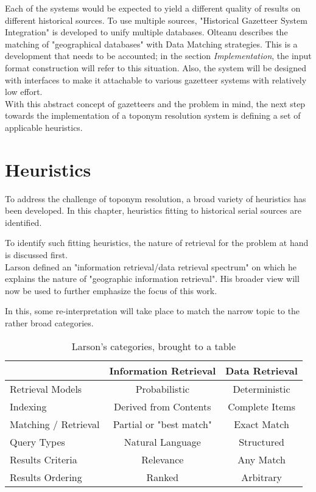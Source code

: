 \documentclass[11pt]{article}
\begin{document}
Each of the systems would be expected to yield a different quality of results on different historical sources. To use multiple sources, "Historical Gazetteer System Integration"\cite{berman12} is developed to unify multiple databases. Olteanu describes the matching of "geographical databases" with Data Matching strategies. \cite{olteanu08} This is a development that needs to be accounted; in the section \emph{Implementation}, the input format construction will refer to this situation. Also, the system will be designed with interfaces to make it attachable to various gazetteer systems with relatively low effort.\\

With this abstract concept of gazetteers and the problem in mind, the next step towards the implementation of a toponym resolution system is defining a set of applicable heuristics.

\section{Heuristics}
To address the challenge of toponym resolution, a broad variety of heuristics has been developed. In this chapter, heuristics fitting to historical serial sources are identified.

To identify such fitting heuristics, the nature of retrieval for the problem at hand is discussed first.\\

Larson defined an "information retrieval/data retrieval spectrum" on which he explains the nature of "geographic information retrieval". \cite{larson96} His broader view will now be used to further emphasize the focus of this work.

In this, some re-interpretation will take place to match the narrow topic to the rather broad categories.

\begin{table*}[htb!]
  \centering
  \begin{tabular}{l||c|c}
   & Information Retrieval & Data Retrieval \\
  \hline
  Retrieval Models & Probabilistic & Deterministic \\
  Indexing & Derived from Contents & Complete Items \\
  Matching / Retrieval & Partial or "best match" & Exact Match \\
  Query Types & Natural Language & Structured \\
  Results Criteria & Relevance & Any Match \\
  Results Ordering & Ranked & Arbitrary \\
  \end{tabular}
  \caption{Larson's categories, brought to a table}
  \label{tab:larson}
\end{table*}
\end{document}
